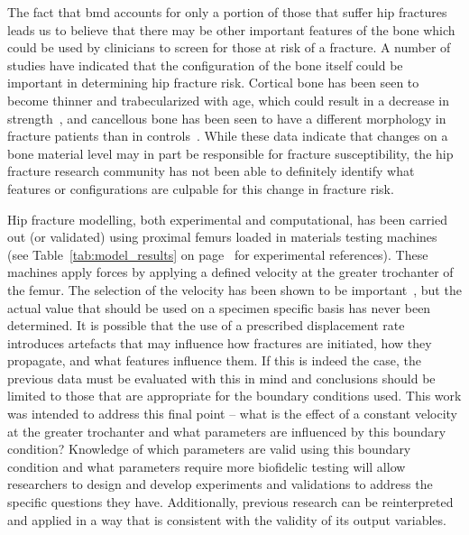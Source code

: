 The fact that \ac{bmd} accounts for only a portion of those that suffer hip fractures leads us to believe that there may be other important features of the bone which could be used by clinicians to screen for those at risk of a fracture.
A number of studies have indicated that the configuration of the bone itself could be important in determining hip fracture risk.
Cortical bone has been seen to become thinner and trabecularized with age, which could result in a decrease in strength~\citep{crabtree_intracapsular_2001, blain_cortical_2008, mayhew_relation_2005}, and cancellous bone has been seen to have a different morphology in fracture patients than in controls~\cite{manske_cortical_2008, blain_cortical_2008}.
While these data indicate that changes on a bone material level may in part be responsible for fracture susceptibility, the hip fracture research community has not been able to definitely identify what features or configurations are culpable for this change in fracture risk.

Hip fracture modelling, both experimental and computational, has been carried out (or validated) using proximal femurs loaded in materials testing machines (see Table~\ref{tab:model_results} on page~\pageref{tab:model_results} for experimental references).
These machines apply forces by applying a defined velocity at the greater trochanter of the femur.
The selection of the velocity has been shown to be important~\citep{courtney_effects_1994, weber_proximal_1992}, but the actual value that should be used on a specimen specific basis has never been determined.
It is possible that the use of a prescribed displacement rate introduces artefacts that may influence how fractures are initiated, how they propagate, and what features influence them.
If this is indeed the case, the previous data must be evaluated with this in mind and conclusions should be limited to those that are appropriate for the boundary conditions used.
This work was intended to address this final point -- what is the effect of a constant velocity at the greater trochanter and what parameters are influenced by this boundary condition?
Knowledge of which parameters are valid using this boundary condition and what parameters require more biofidelic testing will allow researchers to design and develop experiments and validations to address the specific questions they have.
Additionally, previous research can be reinterpreted and applied in a way that is consistent with the validity of its output variables.

